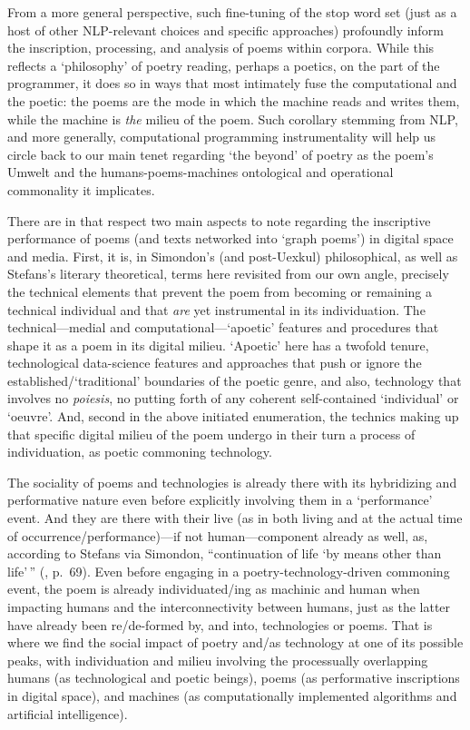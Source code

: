 From a more general perspective, such fine-tuning of the stop word set
(just as a host of other NLP-relevant choices and specific approaches)
profoundly inform the inscription, processing, and analysis of poems
within corpora. While this reflects a `philosophy' of poetry reading,
perhaps a poetics, on the part of the programmer, it does so in ways
that most intimately fuse the computational and the poetic: the poems
are the mode in which the machine reads and writes them, while the
machine is \emph{the} milieu of the poem. Such corollary stemming from
NLP, and more generally, computational programming instrumentality will
help us circle back to our main tenet regarding `the beyond' of poetry
as the poem's Umwelt and the humans-poems-machines ontological and
operational commonality it implicates.

There are in that respect two main aspects to note regarding the
inscriptive performance of poems (and texts networked into `graph
poems') in digital space and media. First, it is, in Simondon's (and
post-Uexkul) philosophical, as well as Stefans's literary theoretical,
terms here revisited from our own angle, precisely the technical
elements that prevent the poem from becoming or remaining a technical
individual and that \emph{are} yet instrumental in its individuation.
The technical---medial and computational---`apoetic' features and
procedures that shape it as a poem in its digital milieu. `Apoetic' here
has a twofold tenure, technological data-science features and approaches
that push or ignore the established/`traditional' boundaries of the
poetic genre, and also, technology that involves no \emph{poiesis}, no
putting forth of any coherent self-contained `individual' or `oeuvre'.
And, second in the above initiated enumeration, the technics making up
that specific digital milieu of the poem undergo in their turn a process
of individuation, as poetic commoning technology.

The sociality of poems and technologies is already there with its
hybridizing and performative nature even before explicitly involving
them in a `performance' event. And they are there with their live (as in
both living and at the actual time of occurrence/performance)---if not
human---component already as well, as, according to Stefans via
Simondon, ``continuation of life `by means other than life'\,''
(\cite{stefans2017word}, p.~69). Even before engaging in a
poetry-technology-driven commoning event, the poem is already
individuated/ing as machinic and human when impacting humans and the
interconnectivity between humans, just as the latter have already been
re/de-formed by, and into, technologies or poems. That is where we find
the social impact of poetry and/as technology at one of its possible
peaks, with individuation and milieu involving the processually
overlapping humans (as technological and poetic beings), poems (as
performative inscriptions in digital space), and machines (as
computationally implemented algorithms and artificial intelligence).

